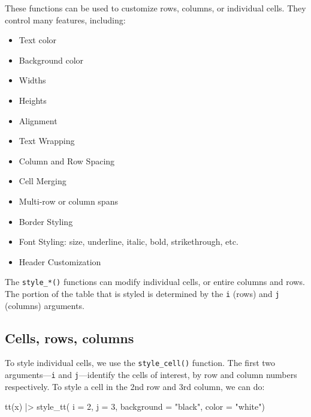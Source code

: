 \documentclass[
  letterpaper,
  DIV=11,
  numbers=noendperiod]{scrartcl}
\newenvironment{Shaded}{\begin{snugshade}}{\end{snugshade}}
\newcommand{\AttributeTok}[1]{\textcolor[rgb]{0.40,0.45,0.13}{#1}}
\newcommand{\DecValTok}[1]{\textcolor[rgb]{0.68,0.00,0.00}{#1}}
\newcommand{\FunctionTok}[1]{\textcolor[rgb]{0.28,0.35,0.67}{#1}}
\newcommand{\NormalTok}[1]{\textcolor[rgb]{0.00,0.23,0.31}{#1}}
\newcommand{\SpecialCharTok}[1]{\textcolor[rgb]{0.37,0.37,0.37}{#1}}
\newcommand{\StringTok}[1]{\textcolor[rgb]{0.13,0.47,0.30}{#1}}
\providecommand{\tightlist}{%
  \setlength{\itemsep}{0pt}\setlength{\parskip}{0pt}}\usepackage{longtable,booktabs,array}
\begin{document}
These functions can be used to customize rows, columns, or individual
cells. They control many features, including:

\begin{itemize}
\tightlist
\item
  Text color
\item
  Background color
\item
  Widths
\item
  Heights
\item
  Alignment
\item
  Text Wrapping
\item
  Column and Row Spacing
\item
  Cell Merging
\item
  Multi-row or column spans
\item
  Border Styling
\item
  Font Styling: size, underline, italic, bold, strikethrough, etc.
\item
  Header Customization
\end{itemize}

The \texttt{style\_*()} functions can modify individual cells, or entire
columns and rows. The portion of the table that is styled is determined
by the \texttt{i} (rows) and \texttt{j} (columns) arguments.

\subsection{Cells, rows, columns}\label{cells-rows-columns}

To style individual cells, we use the \texttt{style\_cell()} function.
The first two arguments---\texttt{i} and \texttt{j}---identify the cells
of interest, by row and column numbers respectively. To style a cell in
the 2nd row and 3rd column, we can do:

\begin{Shaded}
\begin{Highlighting}[]
\FunctionTok{tt}\NormalTok{(x) }\SpecialCharTok{|\textgreater{}}
  \FunctionTok{style\_tt}\NormalTok{(}
    \AttributeTok{i =} \DecValTok{2}\NormalTok{,}
    \AttributeTok{j =} \DecValTok{3}\NormalTok{,}
    \AttributeTok{background =} \StringTok{"black"}\NormalTok{,}
    \AttributeTok{color =} \StringTok{"white"}\NormalTok{)}
\end{Highlighting}
\end{Shaded}
\end{document}
